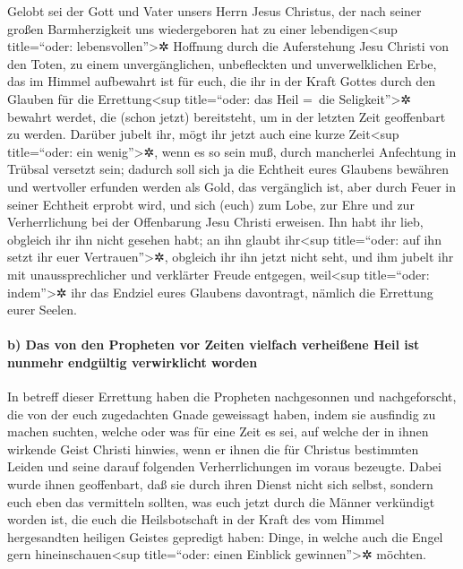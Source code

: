  Gelobt sei der Gott und Vater unsers Herrn Jesus
Christus, der nach seiner großen Barmherzigkeit uns wiedergeboren hat zu
einer lebendigen\textless sup title=``oder: lebensvollen''\textgreater✲
Hoffnung durch die Auferstehung Jesu Christi von den Toten,
 zu einem unvergänglichen, unbefleckten und
unverwelklichen Erbe, das im Himmel aufbewahrt ist für euch,
 die ihr in der Kraft Gottes durch den Glauben für die
Errettung\textless sup title=``oder: das Heil =~die
Seligkeit''\textgreater✲ bewahrt werdet, die (schon jetzt) bereitsteht,
um in der letzten Zeit geoffenbart zu werden.  Darüber
jubelt ihr, mögt ihr jetzt auch eine kurze Zeit\textless sup
title=``oder: ein wenig''\textgreater✲, wenn es so sein muß, durch
mancherlei Anfechtung in Trübsal versetzt sein;  dadurch
soll sich ja die Echtheit eures Glaubens bewähren und wertvoller
erfunden werden als Gold, das vergänglich ist, aber durch Feuer in
seiner Echtheit erprobt wird, und sich (euch) zum Lobe, zur Ehre und zur
Verherrlichung bei der Offenbarung Jesu Christi erweisen. 
Ihn habt ihr lieb, obgleich ihr ihn nicht gesehen habt; an ihn glaubt
ihr\textless sup title=``oder: auf ihn setzt ihr euer
Vertrauen''\textgreater✲, obgleich ihr ihn jetzt nicht seht, und ihm
jubelt ihr mit unaussprechlicher und verklärter Freude entgegen,
 weil\textless sup title=``oder: indem''\textgreater✲ ihr
das Endziel eures Glaubens davontragt, nämlich die Errettung eurer
Seelen.

\hypertarget{b-das-von-den-propheten-vor-zeiten-vielfach-verheiuxdfene-heil-ist-nunmehr-endguxfcltig-verwirklicht-worden}{%
\paragraph{b) Das von den Propheten vor Zeiten vielfach verheißene Heil
ist nunmehr endgültig verwirklicht
worden}\label{b-das-von-den-propheten-vor-zeiten-vielfach-verheiuxdfene-heil-ist-nunmehr-endguxfcltig-verwirklicht-worden}}

 In betreff dieser Errettung haben die Propheten
nachgesonnen und nachgeforscht, die von der euch zugedachten Gnade
geweissagt haben,  indem sie ausfindig zu machen suchten,
welche oder was für eine Zeit es sei, auf welche der in ihnen wirkende
Geist Christi hinwies, wenn er ihnen die für Christus bestimmten Leiden
und seine darauf folgenden Verherrlichungen im voraus bezeugte.
 Dabei wurde ihnen geoffenbart, daß sie durch ihren
Dienst nicht sich selbst, sondern euch eben das vermitteln sollten, was
euch jetzt durch die Männer verkündigt worden ist, die euch die
Heilsbotschaft in der Kraft des vom Himmel hergesandten heiligen Geistes
gepredigt haben: Dinge, in welche auch die Engel gern
hineinschauen\textless sup title=``oder: einen Einblick
gewinnen''\textgreater✲ möchten.

